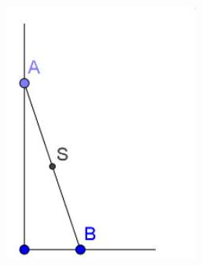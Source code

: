 \documentclass[10pt]{article}
\begin{document}
\begin{enumerate}
\includegraphics[max width=\textwidth, center]{2024_11_21_a2b9e49dabde1310792eg-1}
\end{enumerate}
\end{document}
